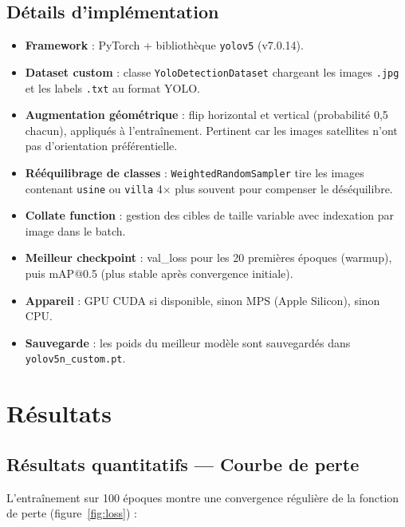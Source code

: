 \documentclass[12pt,a4paper]{article}
\begin{document}
\subsection{Détails d'implémentation}

\begin{itemize}
    \item \textbf{Framework} : PyTorch + bibliothèque \texttt{yolov5} (v7.0.14).
    \item \textbf{Dataset custom} : classe \texttt{YoloDetectionDataset} chargeant les images \texttt{.jpg} et les labels \texttt{.txt} au format YOLO.
    \item \textbf{Augmentation géométrique} : flip horizontal et vertical (probabilité 0,5 chacun), appliqués à l'entraînement. Pertinent car les images satellites n'ont pas d'orientation préférentielle.
    \item \textbf{Rééquilibrage de classes} : \texttt{WeightedRandomSampler} tire les images contenant \texttt{usine} ou \texttt{villa} 4$\times$ plus souvent pour compenser le déséquilibre.
    \item \textbf{Collate function} : gestion des cibles de taille variable avec indexation par image dans le batch.
    \item \textbf{Meilleur checkpoint} : val\_loss pour les 20 premières époques (warmup), puis mAP@0.5 (plus stable après convergence initiale).
    \item \textbf{Appareil} : GPU CUDA si disponible, sinon MPS (Apple Silicon), sinon CPU.
    \item \textbf{Sauvegarde} : les poids du meilleur modèle sont sauvegardés dans \texttt{yolov5n\_custom.pt}.
\end{itemize}

\section{Résultats}\label{sec:results}

\subsection{Résultats quantitatifs --- Courbe de perte}

L'entraînement sur 100 époques montre une convergence régulière de la fonction de perte (figure~\ref{fig:loss}) :
\end{document}
